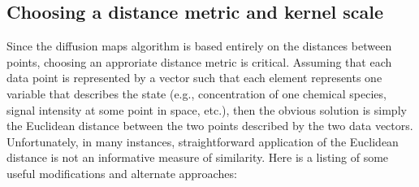 \documentclass[12pt]{article}
\begin{document}
\subsection{Choosing a distance metric and kernel scale}

Since the diffusion maps algorithm is based entirely on the distances between points, choosing an approriate distance metric is critical. Assuming that each data point is represented by a vector such that each element represents one variable that describes the state (e.g., concentration of one chemical species, signal intensity at some point in space, etc.), then the obvious solution is simply the Euclidean distance between the two points described by the two data vectors. Unfortunately, in many instances, straightforward application of the Euclidean distance is not an informative measure of similarity. Here is a listing of some useful modifications and alternate approaches:
\end{document}
